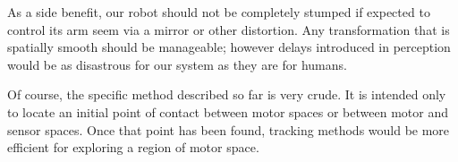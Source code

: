 As a side benefit, our robot should not be completely stumped if
expected to control its arm seem via a mirror or other distortion.
Any transformation that is spatially smooth should be manageable;
however delays introduced in perception would be as disastrous for our
system as they are for humans.

Of course, the specific method described so far is very crude.  It is
intended only to locate an initial point of contact between motor
spaces or between motor and sensor spaces.  Once that point has been
found, tracking methods would be more efficient for exploring a region
of motor space.












